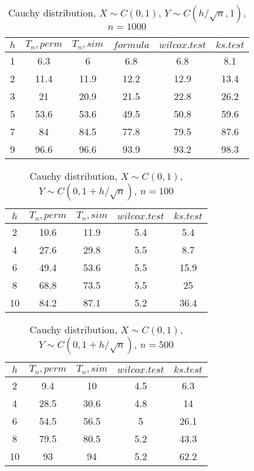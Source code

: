 \documentclass{svproc}
\begin{document}
\begin{table}
  \caption{Cauchy distribution, $X\sim C(0,1)$, $Y\sim C(h/\sqrt{n},1)$, $n=1000$}
  \begin{center}
  \begin{tabular}{c@{\quad}c@{\quad}c@{\quad}c@{\quad}c@{\quad}c}
  \hline
  $h$  & $T_n, perm$ & $T_n, sim$ & $formula$ & $wilcox.test$ & $ks.test$ \\
  \hline
  1 & 6.3 & 6 & 6.8 & 6.8 & 8.1 \\
  2 & 11.4 & 11.9 & 12.2 & 12.9 & 13.4 \\
  3 & 21 & 20.9 & 21.5 & 22.8 & 26.2 \\
  5 & 53.6 & 53.6 & 49.5 & 50.8 & 59.6 \\
  7 & 84 & 84.5 & 77.8 & 79.5 & 87.6 \\
  9 & 96.6 & 96.6 & 93.9 & 93.2 & 98.3 \\
  \hline
  \end{tabular}
  \end{center}
\end{table}

\begin{table}
  \caption{Cauchy distribution, $X\sim C(0,1)$, $Y\sim C(0, 1 + h/\sqrt{n})$, $n=100$}
  \begin{center}
  \begin{tabular}{c@{\quad}c@{\quad}c@{\quad}c@{\quad}c}
  \hline
  $h$ & $T_n, perm$ & $T_n, sim$ & $wilcox.test$ & $ks.test$ \\
  \hline
  2 & 10.6 & 11.9 & 5.4 & 5.4 \\
  4 & 27.6 & 29.8 & 5.5 & 8.7 \\
  6 & 49.4 & 53.6 & 5.5 & 15.9 \\
  8 & 68.8 & 73.5 & 5.5 & 25 \\
  10 & 84.2 & 87.1 & 5.2 & 36.4 \\
  \hline
  \end{tabular}
  \end{center}
\end{table}

\begin{table}
  \caption{Cauchy distribution, $X\sim C(0,1)$, $Y\sim C(0, 1 + h/\sqrt{n})$, $n=500$}
  \begin{center}
  \begin{tabular}{c@{\quad}c@{\quad}c@{\quad}c@{\quad}c}
  \hline
  $h$ & $T_n, perm$ & $T_n, sim$ & $wilcox.test$ & $ks.test$ \\
  \hline
  2 & 9.4 & 10 & 4.5 & 6.3 \\
  4 & 28.5 & 30.6 & 4.8 & 14 \\
  6 & 54.5 & 56.5 & 5 & 26.1 \\
  8 & 79.5 & 80.5 & 5.2 & 43.3 \\
  10 & 93 & 94 & 5.2 & 62.2 \\
  \hline
  \end{tabular}
  \end{center}
\end{table}
\end{document}
